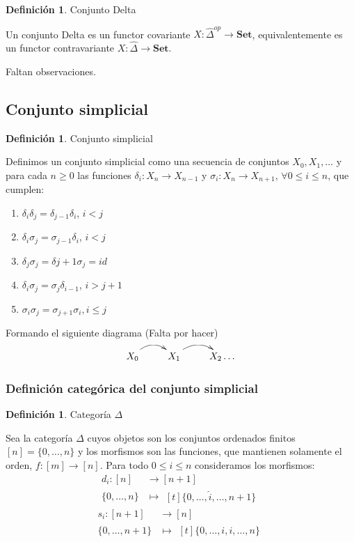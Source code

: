 \documentclass[11pt,a4paper,openright,oneside]{article}
\numberwithin{equation}{section}
\theoremstyle{definition}
\newtheorem{defi}[teo]{Definici\'on}
\begin{document}
\begin{defi}
    Conjunto Delta
\end{defi}
Un conjunto Delta es un functor covariante $X: \hat{\Delta}^{op} \longrightarrow \mathbf{Set}$, equivalentemente es un functor contravariante $X: \hat{\Delta} \longrightarrow \mathbf{Set}$.

Faltan observaciones.

\subsection{Conjunto simplicial}
\begin{defi}
    Conjunto simplicial
\end{defi}
Definimos un conjunto simplicial como una secuencia de conjuntos $X_0,X_1,\dots$ y para cada $n\ge 0$ las funciones $\delta_i: X_n \longrightarrow X_{n-1}$ y $\sigma_i: X_n \longrightarrow X_{n+1}$, $\forall 0\le i \le n$, que cumplen:

\begin{enumerate}[(1)]
    \item $\delta_i\delta_j = \delta_{j-1}\delta_{i}$, $i<j$
    \item $\delta_i\sigma_j = \sigma_{j-1}\delta_{i}$, $i<j$
    \item $\delta_j\sigma_j = \delta{j+1}\sigma_{j} = id$
    \item $\delta_i\sigma_j = \sigma_{j}\delta_{i-1}$, $i>j+1$
    \item $\sigma_i\sigma_j = \sigma_{j+1}\sigma_{i}, i\le j$
\end{enumerate}
Formando el siguiente diagrama (Falta por hacer)

$$ %
    \xymatrix{
    X_0  \ar@/{}^{1pc}/[r]  & X_1  \ar@/{}^{1pc}/[r] & X_2  \dots
    }
$$

\subsubsection{Definici\'on categ\'orica del conjunto simplicial}
\begin{defi}
    Categor\'ia $\Delta$
\end{defi}
Sea la categor\'ia $\Delta$ cuyos objetos son los conjuntos ordenados finitos $[n] = \{0,\dots,n\}$ y los morfismos son las funciones, que mantienen solamente el orden, $f: [m] \longrightarrow [n]$.
Para todo $0\le i \le n$ consideramos los morfismos:
\begin{align*}
    d_i: [n]      & \longrightarrow [n+1] \\
    \{0,\dots,n\} & \longmapsto\!
    \begin{aligned}[t]
        \{0,\dots, \hat{i}, \dots,n+1\}
    \end{aligned}
\end{align*}
\begin{align*}
    s_i: [n+1]      & \longrightarrow [n] \\
    \{0,\dots,n+1\} & \longmapsto\!
    \begin{aligned}[t]
        \{0,\dots,i,i, \dots,n\}
    \end{aligned}
\end{align*}
\end{document}
